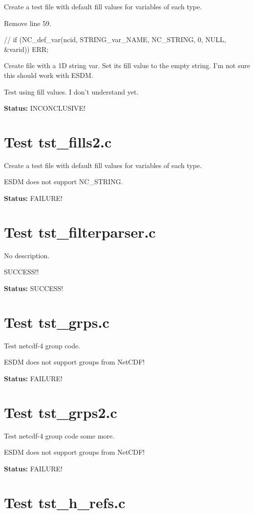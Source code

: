 Create a test file with default fill values for variables of each type.

Remove line 59.

// if (NC\_def\_var(ncid, STRING\_var\_NAME, NC\_STRING, 0, NULL, \&varid)) ERR;

Create file with a 1D string var. Set its fill value to the empty string.
I'm not sure this should work with ESDM.

Test using fill values. I don't understand yet.

{\bf \large Status: } INCONCLUSIVE!

\section{Test tst\_fills2.c}

Create a test file with default fill values for variables of each type.

ESDM does not support NC\_STRING.

{\bf \large Status: } FAILURE!

\section{Test tst\_filterparser.c}

No description.

SUCCESS!!

{\bf \large Status: } SUCCESS!

\section{Test tst\_grps.c}

Test netcdf-4 group code.

ESDM does not support groups from NetCDF!

{\bf \large Status: } FAILURE!

\section{Test tst\_grps2.c}

Test netcdf-4 group code some more.

ESDM does not support groups from NetCDF!

{\bf \large Status: } FAILURE!

\section{Test tst\_h\_refs.c}

